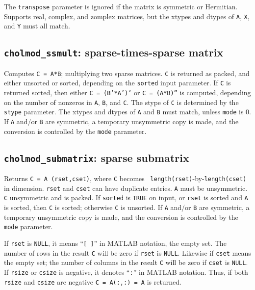 \documentclass[11pt]{article}
\begin{document}
The {\tt transpose} parameter is ignored if the matrix is symmetric or
Hermitian.  Supports real, complex, and zomplex matrices, but the xtypes and
dtypes of {\tt A}, {\tt X}, and {\tt Y} must all match.

\subsection{{\tt cholmod\_ssmult}: sparse-times-sparse matrix}


Computes {\tt C = A*B}; multiplying two sparse matrices.  {\tt C} is returned
as packed, and either unsorted or sorted, depending on the {\tt sorted} input
parameter.  If {\tt C} is returned sorted, then either {\tt C = (B'*A')'} or
{\tt C = (A*B)''} is computed, depending on the number of nonzeros in {\tt A},
{\tt B}, and {\tt C}.  The stype of {\tt C} is determined by the {\tt stype}
parameter.  The xtypes and dtypes of \verb'A' and \verb'B' must match,
unless \verb'mode' is 0.
%
If \verb'A' and/or \verb'B' are symmetric, a temporary unsymmetric copy is
made, and the conversion is controlled by the \verb'mode' parameter.

\subsection{{\tt cholmod\_submatrix}: sparse submatrix}


Returns {\tt C = A (rset,cset)}, where {\tt C} becomes {\tt
length(rset)}-by-{\tt length(cset)} in dimension.  {\tt rset} and {\tt cset}
can have duplicate entries.  {\tt A} must be unsymmetric.  {\tt C} unsymmetric
and is packed.  If {\tt sorted} is {\tt TRUE} on input, or {\tt rset} is sorted
and {\tt A} is sorted, then {\tt C} is sorted; otherwise {\tt C} is unsorted.
%
If \verb'A' and/or \verb'B' are symmetric, a temporary unsymmetric copy is
made, and the conversion is controlled by the \verb'mode' parameter.

If {\tt rset} is {\tt NULL}, it means ``{\tt [ ]}'' in MATLAB notation, the
empty set.  The number of rows in the result {\tt C} will be zero if {\tt rset}
is {\tt NULL}.  Likewise if {\tt cset} means the empty set; the number of
columns in the result {\tt C} will be zero if {\tt cset} is {\tt NULL}.  If
{\tt rsize} or {\tt csize} is negative, it denotes ``{\tt :}'' in MATLAB
notation.  Thus, if both {\tt rsize} and {\tt csize} are negative {\tt C =
A(:,:) = A} is returned.
\end{document}
